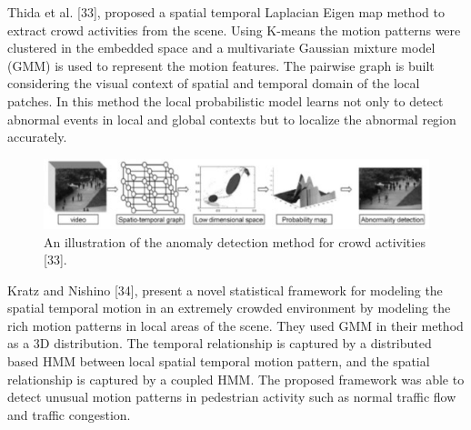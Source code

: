 Thida et al. [33], proposed a spatial temporal Laplacian Eigen map method to extract crowd activities from the scene. Using K-means the motion patterns were clustered in the embedded space and a multivariate Gaussian mixture model (GMM) is used to represent the motion features. The pairwise graph is built considering the visual context of spatial and temporal domain of the local patches. In this method the local probabilistic model learns not only to detect abnormal events in local and global contexts but to localize the abnormal region accurately.
\begin{figure}[ht]
\centering
\includegraphics{Chapters/add}
\decoRule
\caption[An illustration of the anomaly detection method for crowd activities "33".]{An illustration of the anomaly detection method for crowd activities [33].}
\label{fig:la}
\end{figure}
\newpage
Kratz and Nishino [34], present a novel statistical framework for modeling the spatial temporal motion in an extremely crowded environment by modeling the rich motion patterns in local areas of the scene. They used GMM in their method as a 3D distribution. The temporal relationship is captured by a distributed based HMM between local spatial temporal motion pattern, and the spatial relationship is captured by a coupled HMM. The proposed framework was able to detect unusual motion patterns in pedestrian activity such as normal traffic flow and traffic congestion.\\

